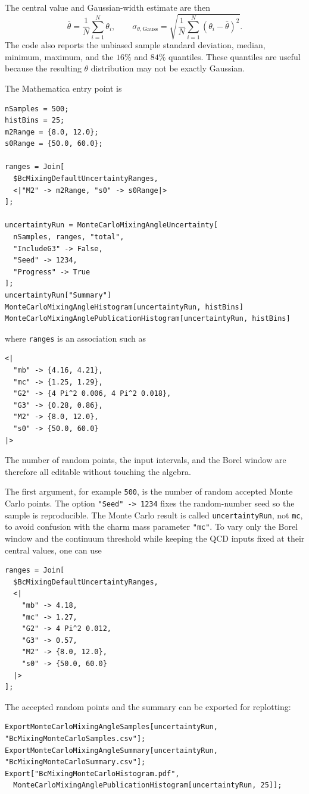 \documentclass[11pt]{article}
\begin{document}
The central value and Gaussian-width estimate are then
\begin{equation}
  \bar\theta = \frac{1}{N}\sum_{i=1}^N \theta_i,
  \qquad
  \sigma_{\theta,\mathrm{Gauss}} =
  \sqrt{\frac{1}{N}\sum_{i=1}^N
  \left(\theta_i-\bar\theta\right)^2}.
\end{equation}
The code also reports the unbiased sample standard deviation, median, minimum,
maximum, and the \(16\%\) and \(84\%\) quantiles. These quantiles are useful
because the resulting \(\theta\) distribution may not be exactly Gaussian.

The Mathematica entry point is
\begin{verbatim}
nSamples = 500;
histBins = 25;
m2Range = {8.0, 12.0};
s0Range = {50.0, 60.0};

ranges = Join[
  $BcMixingDefaultUncertaintyRanges,
  <|"M2" -> m2Range, "s0" -> s0Range|>
];

uncertaintyRun = MonteCarloMixingAngleUncertainty[
  nSamples, ranges, "total",
  "IncludeG3" -> False,
  "Seed" -> 1234,
  "Progress" -> True
];
uncertaintyRun["Summary"]
MonteCarloMixingAngleHistogram[uncertaintyRun, histBins]
MonteCarloMixingAnglePublicationHistogram[uncertaintyRun, histBins]
\end{verbatim}
where \texttt{ranges} is an association such as
\begin{verbatim}
<|
  "mb" -> {4.16, 4.21},
  "mc" -> {1.25, 1.29},
  "G2" -> {4 Pi^2 0.006, 4 Pi^2 0.018},
  "G3" -> {0.28, 0.86},
  "M2" -> {8.0, 12.0},
  "s0" -> {50.0, 60.0}
|>
\end{verbatim}
The number of random points, the input intervals, and the Borel window are
therefore all editable without touching the algebra.

The first argument, for example \texttt{500}, is the number of random accepted
Monte Carlo points. The option \texttt{"Seed" -> 1234} fixes the random-number
seed so the sample is reproducible. The Monte Carlo result is called
\texttt{uncertaintyRun}, not \texttt{mc}, to avoid confusion with the charm
mass parameter \texttt{"mc"}. To vary only the Borel window and the
continuum threshold while keeping the QCD inputs fixed at their central values,
one can use
\begin{verbatim}
ranges = Join[
  $BcMixingDefaultUncertaintyRanges,
  <|
    "mb" -> 4.18,
    "mc" -> 1.27,
    "G2" -> 4 Pi^2 0.012,
    "G3" -> 0.57,
    "M2" -> {8.0, 12.0},
    "s0" -> {50.0, 60.0}
  |>
];
\end{verbatim}
The accepted random points and the summary can be exported for replotting:
\begin{verbatim}
ExportMonteCarloMixingAngleSamples[uncertaintyRun, "BcMixingMonteCarloSamples.csv"];
ExportMonteCarloMixingAngleSummary[uncertaintyRun, "BcMixingMonteCarloSummary.csv"];
Export["BcMixingMonteCarloHistogram.pdf",
  MonteCarloMixingAnglePublicationHistogram[uncertaintyRun, 25]];
\end{verbatim}
\end{document}
